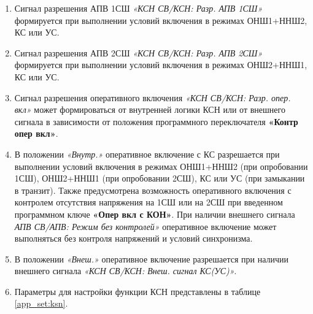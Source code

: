 \begin{enumerate}
\begin{longtable}{|>{\centering\arraybackslash}m{5.3cm}|>{\raggedright\arraybackslash}m{11.6cm}|}
\end{longtable}
\normalsize	

\item
Сигнал разрешения АПВ 1СШ \textit{«КСН СВ/КСН: Разр. АПВ 1СШ»} формируется при выполнении условий включения в
режимах ОНШ1+ННШ2, КС или УС.

\item
Сигнал разрешения АПВ 2СШ \textit{«КСН СВ/КСН: Разр. АПВ 2СШ»} формируется при выполнении условий включения в
режимах ОНШ2+ННШ1, КС или УС. 

\item
Сигнал разрешения оперативного включения \textit{«КСН СВ/КСН: Разр. опер. вкл»} может формироваться от
внутренней логики КСН или от внешнего сигнала в зависимости от положения программного переключателя
\textbf{«Контр опер вкл»}.

\item
В положении \textit{«Внутр.»} оперативное включение с КС разрешается при выполнении условий включения в
режимах ОНШ1+ННШ2 (при опробовании 1СШ), ОНШ2+ННШ1 (при опробовании 2СШ), КС или УС (при
замыкании в транзит). Также предусмотрена возможность оперативного включения с контролем отсутствия
напряжения на 1СШ или на 2СШ при введенном программном ключе \textbf{«Опер вкл с КОН»}. При наличии
внешнего сигнала \textit{АПВ СВ/АПВ: Режим без контролей»} оперативное включение может выполняться без контроля напряжений
и условий синхронизма.

\item
В положении \textit{«Внеш.»} оперативное включение разрешается при наличии внешнего сигнала 
\textit{«КСН СВ/КСН: Внеш. сигнал КС(УС)»}.

\item
Параметры для настройки функции КСН представлены в таблице \ref{app_set:ksn}.

\end{enumerate}